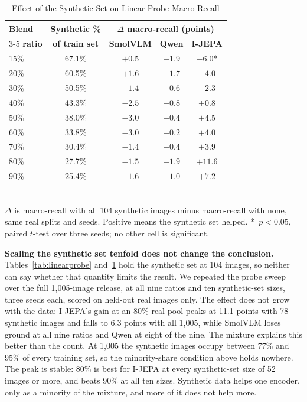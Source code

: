 \documentclass[conference]{IEEEtran}
\begin{document}
\begin{table}[t]
\caption{Effect of the Synthetic Set on Linear-Probe Macro-Recall}
\label{tab:synthsize}
\centering
\begin{tabular}{lcccc}
\toprule
\textbf{Blend} & \textbf{Synthetic \%} & \multicolumn{3}{c}{$\Delta$ \textbf{macro-recall (points)}} \\
\cmidrule(lr){3-5}
\textbf{ratio} & \textbf{of train set} & \textbf{SmolVLM} & \textbf{Qwen} & \textbf{I-JEPA} \\
\midrule
15\% & 67.1\% & $+0.5$ & $+1.9$ & $-6.0$* \\
20\% & 60.5\% & $+1.6$ & $+1.7$ & $-4.0$ \\
30\% & 50.5\% & $-1.4$ & $+0.6$ & $-2.3$ \\
40\% & 43.3\% & $-2.5$ & $+0.8$ & $+0.8$ \\
50\% & 38.0\% & $-3.0$ & $+0.4$ & $+4.5$ \\
60\% & 33.8\% & $-3.0$ & $+0.2$ & $+4.0$ \\
70\% & 30.4\% & $-1.4$ & $-0.4$ & $+3.9$ \\
80\% & 27.7\% & $-1.5$ & $-1.9$ & $+11.6$ \\
90\% & 25.4\% & $-1.6$ & $-1.0$ & $+7.2$ \\
\bottomrule
\end{tabular}
\\[2pt]
{\footnotesize $\Delta$ is macro-recall with all 104 synthetic images minus macro-recall with none, same real splits and seeds. Positive means the synthetic set helped. *~$p<0.05$, paired $t$-test over three seeds; no other cell is significant.}
\end{table}

\textbf{Scaling the synthetic set tenfold does not change the conclusion.} Tables~\ref{tab:linearprobe} and~\ref{tab:synthsize} hold the synthetic set at 104 images, so neither can say whether that quantity limits the result. We repeated the probe sweep over the full 1{,}005-image release, at all nine ratios and ten synthetic-set sizes, three seeds each, scored on held-out real images only. The effect does not grow with the data: I-JEPA's gain at an 80\% real pool peaks at 11.1 points with 78 synthetic images and falls to 6.3 points with all 1{,}005, while SmolVLM loses ground at all nine ratios and Qwen at eight of the nine. The mixture explains this better than the count. At 1{,}005 the synthetic images occupy between 77\% and 95\% of every training set, so the minority-share condition above holds nowhere. The peak is stable: 80\% is best for I-JEPA at every synthetic-set size of 52 images or more, and beats 90\% at all ten sizes. Synthetic data helps one encoder, only as a minority of the mixture, and more of it does not help more.
\end{document}
